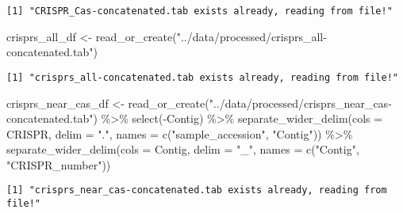 \documentclass[
  twocolumn,
  landscape]{report}
\newenvironment{Shaded}{}{}
\newcommand{\AttributeTok}[1]{\textcolor[rgb]{0.84,0.23,0.29}{#1}}
\newcommand{\FunctionTok}[1]{\textcolor[rgb]{0.44,0.26,0.76}{#1}}
\newcommand{\NormalTok}[1]{\textcolor[rgb]{0.14,0.16,0.18}{#1}}
\newcommand{\OtherTok}[1]{\textcolor[rgb]{0.44,0.26,0.76}{#1}}
\newcommand{\SpecialCharTok}[1]{\textcolor[rgb]{0.00,0.36,0.77}{#1}}
\newcommand{\StringTok}[1]{\textcolor[rgb]{0.01,0.18,0.38}{#1}}
\begin{document}
\begin{verbatim}
[1] "CRISPR_Cas-concatenated.tab exists already, reading from file!"
\end{verbatim}

\begin{Shaded}
\begin{Highlighting}[]
\NormalTok{crisprs\_all\_df }\OtherTok{\textless{}{-}} \FunctionTok{read\_or\_create}\NormalTok{(}\StringTok{"../data/processed/crisprs\_all{-}concatenated.tab"}\NormalTok{)}
\end{Highlighting}
\end{Shaded}

\begin{verbatim}
[1] "crisprs_all-concatenated.tab exists already, reading from file!"
\end{verbatim}

\begin{Shaded}
\begin{Highlighting}[]
\NormalTok{crisprs\_near\_cas\_df }\OtherTok{\textless{}{-}} \FunctionTok{read\_or\_create}\NormalTok{(}\StringTok{"../data/processed/crisprs\_near\_cas{-}concatenated.tab"}\NormalTok{) }\SpecialCharTok{\%\textgreater{}\%}
  \FunctionTok{select}\NormalTok{(}\SpecialCharTok{{-}}\NormalTok{Contig) }\SpecialCharTok{\%\textgreater{}\%}
  \FunctionTok{separate\_wider\_delim}\NormalTok{(}\AttributeTok{cols =}\NormalTok{ CRISPR, }\AttributeTok{delim =} \StringTok{"."}\NormalTok{,}
                       \AttributeTok{names =} \FunctionTok{c}\NormalTok{(}\StringTok{"sample\_accession"}\NormalTok{, }\StringTok{"Contig"}\NormalTok{)) }\SpecialCharTok{\%\textgreater{}\%}
  \FunctionTok{separate\_wider\_delim}\NormalTok{(}\AttributeTok{cols =}\NormalTok{ Contig, }\AttributeTok{delim =} \StringTok{"\_"}\NormalTok{,}
                       \AttributeTok{names =} \FunctionTok{c}\NormalTok{(}\StringTok{"Contig"}\NormalTok{, }\StringTok{"CRISPR\_number"}\NormalTok{))}
\end{Highlighting}
\end{Shaded}

\begin{verbatim}
[1] "crisprs_near_cas-concatenated.tab exists already, reading from file!"
\end{verbatim}
\end{document}
